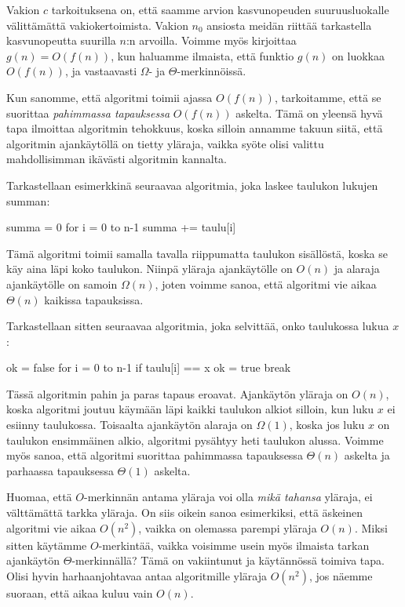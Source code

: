 Vakion $c$ tarkoituksena on, että saamme arvion kasvunopeuden suuruusluokalle välittämättä
vakiokertoimista. Vakion $n_0$ ansiosta meidän riittää tarkastella
kasvunopeutta suurilla $n$:n arvoilla.
Voimme myös kirjoittaa $g(n)=O(f(n))$, kun haluamme ilmaista,
että funktio $g(n)$ on luokkaa $O(f(n))$,
ja vastaavasti $\Omega$- ja $\Theta$-merkinnöissä.

Kun sanomme, että algoritmi toimii ajassa $O(f(n))$, tarkoitamme, että se suorittaa
\emph{pahimmassa tapauksessa} $O(f(n))$ askelta.
Tämä on yleensä hyvä tapa ilmoittaa algoritmin tehokkuus,
koska silloin annamme takuun siitä, että algoritmin ajankäytöllä on tietty yläraja,
vaikka syöte olisi valittu mahdollisimman ikävästi algoritmin kannalta.

Tarkastellaan esimerkkinä seuraavaa algoritmia, joka laskee
taulukon lukujen summan:

\begin{code}
summa = 0
for i = 0 to n-1
    summa += taulu[i]
\end{code}

Tämä algoritmi toimii samalla tavalla riippumatta taulukon sisällöstä,
koska se käy aina läpi koko taulukon.
Niinpä yläraja ajankäytölle on $O(n)$ ja alaraja ajankäytölle on samoin $\Omega(n)$,
joten voimme sanoa, että algoritmi vie aikaa $\Theta(n)$ kaikissa tapauksissa.

Tarkastellaan sitten seuraavaa algoritmia, joka selvittää,
onko taulukossa lukua $x$:

\begin{code}
ok = false
for i = 0 to n-1
    if taulu[i] == x
        ok = true
        break
\end{code}

Tässä algoritmin pahin ja paras tapaus eroavat.
Ajankäytön yläraja on $O(n)$, koska algoritmi joutuu käymään
läpi kaikki taulukon alkiot silloin, kun luku $x$
ei esiinny taulukossa.
Toisaalta ajankäytön alaraja on $\Omega(1)$,
koska jos luku $x$ on taulukon ensimmäinen alkio,
algoritmi pysähtyy heti taulukon alussa.
Voimme myös sanoa, että algoritmi suorittaa pahimmassa
tapauksessa $\Theta(n)$ askelta ja parhaassa tapauksessa
$\Theta(1)$ askelta.

Huomaa, että $O$-merkinnän antama yläraja voi olla
\emph{mikä tahansa} yläraja, ei välttämättä tarkka yläraja.
On siis oikein sanoa esimerkiksi, että äskeinen
algoritmi vie aikaa $O(n^2)$, vaikka on olemassa parempi yläraja $O(n)$.
Miksi sitten käytämme $O$-merkintää, vaikka voisimme usein myös ilmaista tarkan
ajankäytön $\Theta$-merkinnällä?
Tämä on vakiintunut ja käytännössä toimiva tapa.
Olisi hyvin harhaanjohtavaa antaa algoritmille yläraja $O(n^2)$,
jos näemme suoraan, että aikaa kuluu vain $O(n)$.

